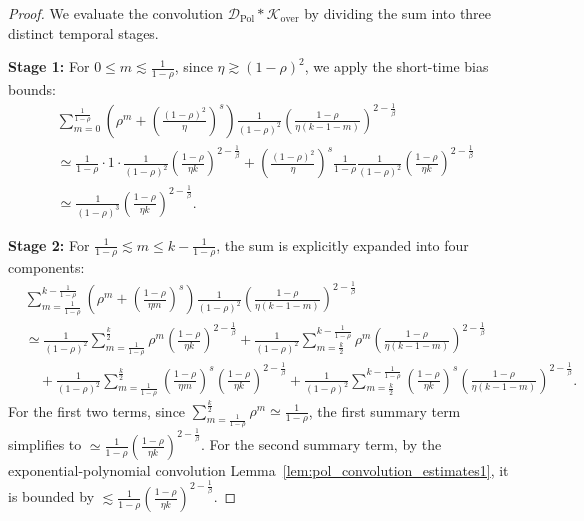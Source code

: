\begin{proof}
We evaluate the convolution $\mathcal{D}_{\mathrm{Pol}} * \mathcal{K}_{\mathrm{over}}$ by dividing the sum into three distinct temporal stages.

\textbf{Stage 1:} For $0 \le m \lesssim \frac{1}{1-\rho}$,  since $\eta \gtrsim (1-\rho)^2$, we apply the short-time bias bounds:
\begin{align*}
    &\sum_{m=0}^{\frac{1}{1-\rho}} \left(\rho^m + \left(\frac{(1-\rho)^2}{\eta}\right)^s\right) \frac{1}{(1-\rho)^2} \left(\frac{1-\rho}{\eta (k-1-m)}\right)^{2-\frac{1}{\beta}}\\
    &\simeq \frac{1}{1-\rho} \cdot 1 \cdot \frac{1}{(1-\rho)^2} \left(\frac{1-\rho}{\eta k}\right)^{2-\frac{1}{\beta}} + \left(\frac{(1-\rho)^2}{\eta}\right)^s \frac{1}{1-\rho} \frac{1}{(1-\rho)^2} \left(\frac{1-\rho}{\eta k}\right)^{2-\frac{1}{\beta}} \\
    &\simeq \frac{1}{(1-\rho)^3} \left(\frac{1-\rho}{\eta k}\right)^{2-\frac{1}{\beta}}.
\end{align*}

\textbf{Stage 2:} For $\frac{1}{1-\rho} \lesssim m \le k - \frac{1}{1-\rho}$, the sum is explicitly expanded into four components:
\begin{align*}
    &\sum_{m=\frac{1}{1-\rho}}^{k-\frac{1}{1-\rho}} \left(\rho^m + \left(\frac{1-\rho}{\eta m}\right)^s\right) \frac{1}{(1-\rho)^2} \left(\frac{1-\rho}{\eta (k-1-m)}\right)^{2-\frac{1}{\beta}} \\
    &\simeq \frac{1}{(1-\rho)^2} \sum_{m=\frac{1}{1-\rho}}^{\frac{k}{2}} \rho^m \left(\frac{1-\rho}{\eta k}\right)^{2-\frac{1}{\beta}} + \frac{1}{(1-\rho)^2} \sum_{m=\frac{k}{2}}^{k-\frac{1}{1-\rho}} \rho^m \left(\frac{1-\rho}{\eta (k-1-m)}\right)^{2-\frac{1}{\beta}} \\
    &\quad + \frac{1}{(1-\rho)^2} \sum_{m=\frac{1}{1-\rho}}^{\frac{k}{2}} \left(\frac{1-\rho}{\eta m}\right)^s \left(\frac{1-\rho}{\eta k}\right)^{2-\frac{1}{\beta}} + \frac{1}{(1-\rho)^2} \sum_{m=\frac{k}{2}}^{k-\frac{1}{1-\rho}} \left(\frac{1-\rho}{\eta k}\right)^s \left(\frac{1-\rho}{\eta (k-1-m)}\right)^{2-\frac{1}{\beta}}.
\end{align*}
For the first two terms, since $\sum_{m=\frac{1}{1-\rho}}^{\frac{k}{2}} \rho^m \simeq \frac{1}{1-\rho}$, the first summary term simplifies to $\simeq \frac{1}{1-\rho} \left(\frac{1-\rho}{\eta k}\right)^{2-\frac{1}{\beta}}$. For the second summary term, by the exponential-polynomial convolution Lemma~\ref{lem:pol_convolution_estimates1}, it is bounded by $\lesssim \frac{1}{1-\rho} \left(\frac{1-\rho}{\eta k}\right)^{2-\frac{1}{\beta}}$. 


\end{proof}
